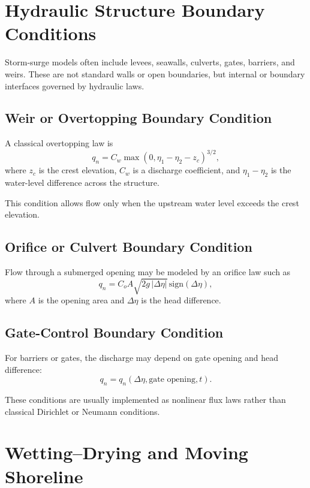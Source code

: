 \documentclass[11pt]{article}
\begin{document}
\section{Hydraulic Structure Boundary Conditions}

Storm-surge models often include levees, seawalls, culverts, gates, barriers, and weirs. These are not standard walls or open boundaries, but internal or boundary interfaces governed by hydraulic laws.

\subsection{Weir or Overtopping Boundary Condition}

A classical overtopping law is
\begin{equation}
q_n = C_w \max\!\left(0,\eta_1-\eta_2-z_c\right)^{3/2},
\end{equation}
where \(z_c\) is the crest elevation, \(C_w\) is a discharge coefficient, and \(\eta_1-\eta_2\) is the water-level difference across the structure.

This condition allows flow only when the upstream water level exceeds the crest elevation.

\subsection{Orifice or Culvert Boundary Condition}

Flow through a submerged opening may be modeled by an orifice law such as
\begin{equation}
q_n = C_o A \sqrt{2g\,|\Delta \eta|}\,\mathrm{sign}(\Delta \eta),
\end{equation}
where \(A\) is the opening area and \(\Delta \eta\) is the head difference.

\subsection{Gate-Control Boundary Condition}

For barriers or gates, the discharge may depend on gate opening and head difference:
\begin{equation}
q_n = q_n(\Delta \eta, \text{gate opening}, t).
\end{equation}

These conditions are usually implemented as nonlinear flux laws rather than classical Dirichlet or Neumann conditions.

\section{Wetting--Drying and Moving Shoreline}
\end{document}
